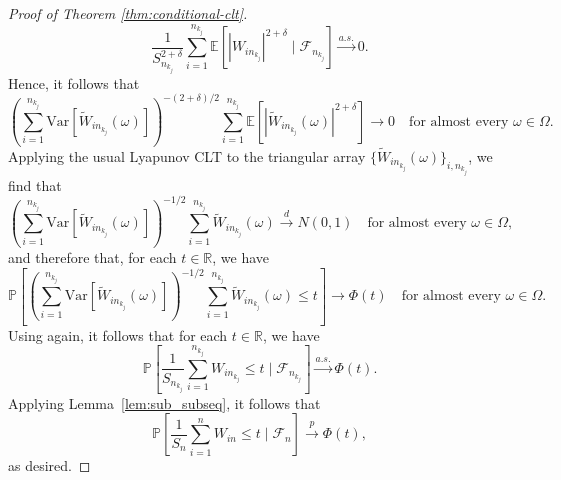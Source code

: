 \documentclass[aos]{imsart}
\theoremstyle{definition}
\theoremstyle{remark}
\newcommand{\E}{\mathbb E}								%
\newcommand{\V}{\mathrm{Var}}							%
\newcommand{\R}{\mathbb{R}}								%
\newcommand{\convp}{\overset p \rightarrow}             %
\newcommand{\convd}{\overset d \rightarrow}             %
\newcommand{\convas}{\overset {a.s.} \rightarrow}       %
\begin{document}
\begin{proof}[Proof of Theorem \ref{thm:conditional-clt}]
		\begin{equation}
			\frac{1}{S_{n_{k_j}}^{2+\delta}} \sum_{i = 1}^{n_{k_j}} \E[|W_{in_{k_j}}|^{2+\delta} \mid \mathcal{F}_{n_{k_j}}] \convas 0.
		\end{equation}
		Hence, it follows that 
		\begin{equation}
			\left(\sum_{i = 1}^{n_{k_j}} \V[\widetilde W_{in_{k_j}}(\omega)]\right)^{-(2+\delta)/2}\sum_{i = 1}^{n_{k_j}} \E[|\widetilde W_{i{n_{k_j}}}(\omega)|^{2+\delta}] \rightarrow 0 \quad \text{for almost every } \omega \in \Omega.
		\end{equation}
		Applying the usual Lyapunov CLT to the triangular array $\{\widetilde W_{in_{k_j}}(\omega)\}_{i,n_{k_j}}$, we find that
		\begin{equation}
			\left(\sum_{i = 1}^{n_{k_j}} \V[\widetilde W_{in_{k_j}}(\omega)]\right)^{-1/2}\sum_{i = 1}^{n_{k_j}} \widetilde W_{in_{k_j}}(\omega) \convd N(0,1) \quad \text{for almost every } \omega \in \Omega,
		\end{equation}
		and therefore that, for each $t \in \R$, we have 
		\begin{equation}
			\mathbb P\left[\left(\sum_{i = 1}^{n_{k_j}} \V[\widetilde W_{in_{k_j}}(\omega)]\right)^{-1/2}\sum_{i = 1}^{n_{k_j}} \widetilde W_{in_{k_j}}(\omega) \leq t\right] \rightarrow \Phi(t) \quad \text{for almost every } \omega \in \Omega.
		\end{equation}
		Using \citet[Theorem 8.38]{Lista2017} again, it follows that for each $t \in \R$, we have
		\begin{equation}
			\mathbb P\left[\frac{1}{S_{n_{k_j}}}\sum_{i = 1}^{n_{k_j}} W_{in_{k_j}} \leq t \mid \mathcal F_{n_{k_j}}\right] \convas \Phi(t).
		\end{equation}
		Applying Lemma~\ref{lem:sub_subseq}, it follows that
		\begin{equation}
			\mathbb P\left[\frac{1}{S_{n}}\sum_{i = 1}^{n} W_{in} \leq t \mid \mathcal F_{n}\right] \convp \Phi(t),
		\end{equation}
		as desired.
	\end{proof}
	
\end{document}

